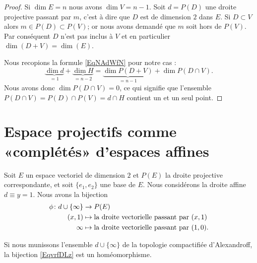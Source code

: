 \begin{proof}
    Si \( \dim E=n\) nous avons \( \dim V=n-1\). Soit \( d=P(D)\) une droite projective passant par \( m\), c'est à dire que \( D\) est de dimension \( 2\) dans \( E\). Si \( D\subset V\) alors \( m\in P(D)\subset P(V)\); or nous avons demandé que \( m\) soit hors de \( P(V)\). Par conséquent \( D\) n'est pas inclus à \( V\) et en particulier \( \dim(D+V)=\dim(E)\).

    Nous recopions la formule \eqref{EqNAdWfN} pour notre cas :
    \begin{equation}
        \underbrace{\dim d}_{=1}+\underbrace{\dim H}_{=n-2}=\underbrace{\dim P(D+V)}_{=n-1}+\dim P(D\cap V).
    \end{equation}
    Nous avons donc \( \dim P(D\cap V)=0\), ce qui signifie que l'ensemble \( P(D\cap V)=P(D)\cap P(V)=d\cap H\) contient un et un seul point.
\end{proof}

\section{Espace projectifs comme «complétés» d'espaces affines}

Soit \( E\) un espace vectoriel de dimension \( 2\) et \( P(E)\) la droite projective correspondante, et soit \( \{ e_1,e_2 \}\) une base de \( E\). Nous considérons la droite affine \( d\equiv y=1\). Nous avons la bijection
\begin{equation}        \label{EqvrfDLz}
    \begin{aligned}
        \phi\colon d\cup\{ \infty \}&\to P(E) \\
        (x,1)&\mapsto \text{la droite vectorielle passant par \( (x,1)\)} \\
        \infty&\mapsto \text{la droite vectorielle passant par \( (1,0)\)}.
    \end{aligned}
\end{equation}

\begin{lemma}
    Si nous munissons l'ensemble \( d\cup\{ \infty \}\) de la topologie compactifiée d'Alexandroff, la bijection \eqref{EqvrfDLz} est un homéomorphisme.
\end{lemma}

